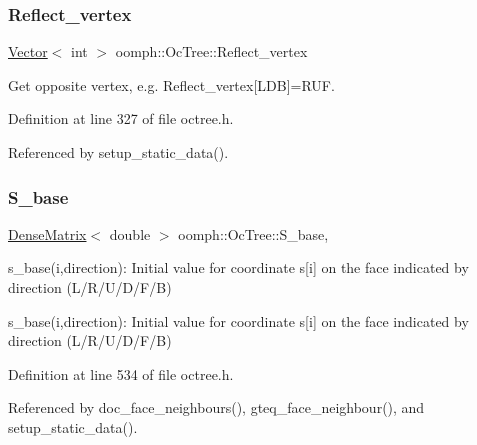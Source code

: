 \subsubsection{\texorpdfstring{Reflect\+\_\+vertex}{Reflect\_vertex}}
{\footnotesize\ttfamily \hyperlink{classoomph_1_1Vector}{Vector}$<$ int $>$ oomph\+::\+Oc\+Tree\+::\+Reflect\+\_\+vertex\hspace{0.3cm}{\ttfamily [static]}}



Get opposite vertex, e.\+g. Reflect\+\_\+vertex\mbox{[}L\+DB\mbox{]}=R\+UF. 



Definition at line 327 of file octree.\+h.



Referenced by setup\+\_\+static\+\_\+data().

\mbox{\label{classoomph_1_1OcTree_a114adf939f2937d16a69a541b8e2ceb3}} 
\subsubsection{\texorpdfstring{S\+\_\+base}{S\_base}}
{\footnotesize\ttfamily \hyperlink{classoomph_1_1DenseMatrix}{Dense\+Matrix}$<$ double $>$ oomph\+::\+Oc\+Tree\+::\+S\+\_\+base\hspace{0.3cm}{\ttfamily [static]}, {\ttfamily [private]}}



s\+\_\+base(i,direction)\+: Initial value for coordinate s\mbox{[}i\mbox{]} on the face indicated by direction (L/\+R/\+U/\+D/\+F/B) 

s\+\_\+base(i,direction)\+: Initial value for coordinate s\mbox{[}i\mbox{]} on the face indicated by direction (L/\+R/\+U/\+D/\+F/B) 

Definition at line 534 of file octree.\+h.



Referenced by doc\+\_\+face\+\_\+neighbours(), gteq\+\_\+face\+\_\+neighbour(), and setup\+\_\+static\+\_\+data().

\mbox{\label{classoomph_1_1OcTree_a9f8afa940d0ce2ceca2a064f3f1ec6b1}} 
